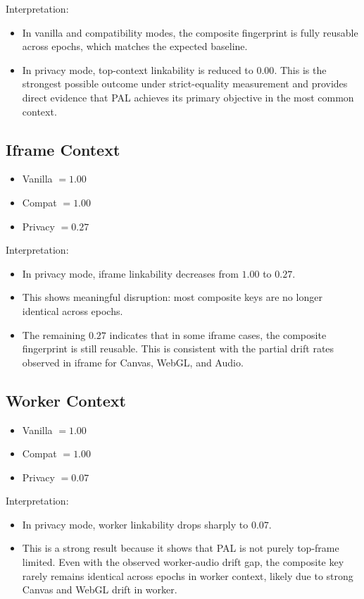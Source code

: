 \documentclass[11pt]{report}
\begin{document}
Interpretation:
\begin{itemize}
    \item In vanilla and compatibility modes, the composite fingerprint is fully reusable across epochs, which matches the expected baseline.
    \item In privacy mode, top-context linkability is reduced to $0.00$. This is the strongest possible outcome under strict-equality measurement and provides direct evidence that PAL achieves its primary objective in the most common context.
\end{itemize}

\subsection{Iframe Context}

\begin{itemize}
    \item Vanilla $=1.00$
    \item Compat $=1.00$
    \item Privacy $=0.27$
\end{itemize}

Interpretation:
\begin{itemize}
    \item In privacy mode, iframe linkability decreases from $1.00$ to $0.27$.
    \item This shows meaningful disruption: most composite keys are no longer identical across epochs.
    \item The remaining $0.27$ indicates that in some iframe cases, the composite fingerprint is still reusable. This is consistent with the partial drift rates observed in iframe for Canvas, WebGL, and Audio.
\end{itemize}

\subsection{Worker Context}

\begin{itemize}
    \item Vanilla $=1.00$
    \item Compat $=1.00$
    \item Privacy $=0.07$
\end{itemize}

Interpretation:
\begin{itemize}
    \item In privacy mode, worker linkability drops sharply to $0.07$.
    \item This is a strong result because it shows that PAL is not purely top-frame limited. Even with the observed worker-audio drift gap, the composite key rarely remains identical across epochs in worker context, likely due to strong Canvas and WebGL drift in worker.
\end{itemize}
\end{document}
